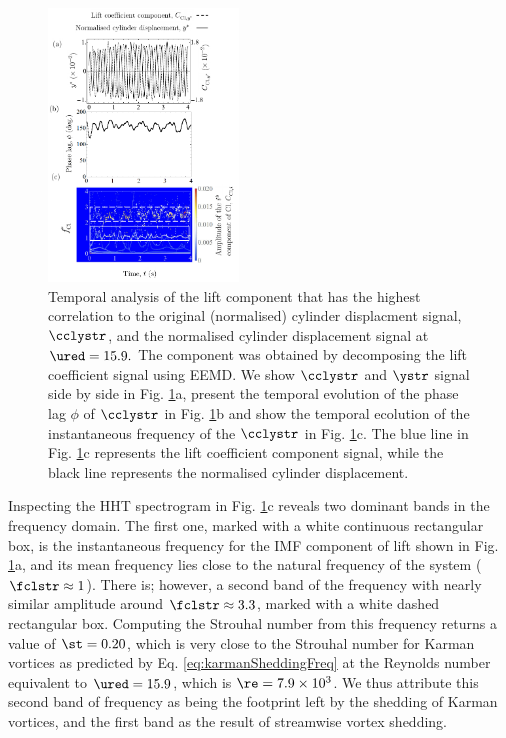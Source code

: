 \documentclass[a4paper,fleqn]{cas-sc}
\begin{document}
\begin{figure}
  \centering
  \includegraphics[width=0.45\textwidth]{figs/figure16}
  \caption{Temporal analysis of the lift component that has the highest correlation to the original (normalised) cylinder displacment signal, $\cclystr$, and the normalised cylinder displacement signal at $\ured = 15.9.$ The component was obtained by decomposing the lift coefficient signal using EEMD. We show $\cclystr$ and $\ystr$ signal side by side in Fig. \ref{fig:tempAnalysisTransition}a, present the temporal evolution of the phase lag $\phi$ of $\cclystr$ in Fig. \ref{fig:tempAnalysisTransition}b and show the temporal ecolution of the instantaneous frequency of the $\cclystr$ in Fig. \ref{fig:tempAnalysisTransition}c. The blue line in Fig. \ref{fig:tempAnalysisTransition}c represents the lift coefficient component signal, while the black line represents the normalised cylinder displacement.}
  \label{fig:tempAnalysisTransition}
\end{figure}

Inspecting the HHT spectrogram in Fig. \ref{fig:tempAnalysisTransition}c reveals two dominant bands in the frequency domain. The first one, marked with a white continuous rectangular box, is the instantaneous frequency for the IMF component of lift shown in Fig. \ref{fig:tempAnalysisTransition}a, and its mean frequency lies close to the natural frequency of the system ($\fclstr \approx 1$). There is; however, a second band of the frequency with nearly similar amplitude around $\fclstr \approx 3.3$, marked with a white dashed rectangular box. Computing the Strouhal number from this frequency returns a value of $\st = 0.20$, which is very close to the Strouhal number for Karman vortices as predicted by Eq. \ref{eq:karmanSheddingFreq} at the Reynolds number equivalent to $\ured = 15.9$, which is $\re = 7.9 \times 10^{3}$. We thus attribute this second band of frequency as being the footprint left by the shedding of Karman vortices, and the first band as the result of streamwise vortex shedding.
\end{document}
